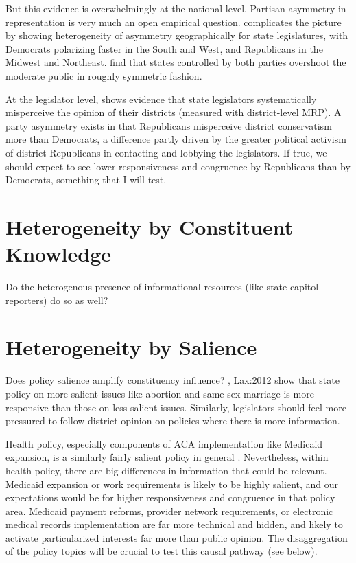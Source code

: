 \documentclass[
  oneside]{book}
\begin{document}
But this evidence is overwhelmingly at the national level. Partisan asymmetry in representation is very much an open empirical question. \citet{Shor:2020} complicates the picture by showing heterogeneity of asymmetry geographically for state legislatures, with Democrats polarizing faster in the South and West, and Republicans in the Midwest and Northeast. \citet{Lax:2012} find that states controlled by both parties overshoot the moderate public in roughly symmetric fashion.

At the legislator level, \citet{Broockman:2017} shows evidence that state legislators systematically misperceive the opinion of their districts (measured with district-level MRP). A party asymmetry exists in that Republicans misperceive district conservatism more than Democrats, a difference partly driven by the greater political activism of district Republicans in contacting and lobbying the legislators. If true, we should expect to see lower responsiveness and congruence by Republicans than by Democrats, something that I will test.

\hypertarget{heterogeneity-by-constituent-knowledge}{%
\section{Heterogeneity by Constituent Knowledge}\label{heterogeneity-by-constituent-knowledge}}

Do the heterogenous presence of informational resources (like state capitol reporters) do so as well?

\hypertarget{heterogeneity-by-salience}{%
\section{Heterogeneity by Salience}\label{heterogeneity-by-salience}}

Does policy salience amplify constituency influence? \citet{Lax:2009}, Lax:2012 show that state policy on more salient issues like abortion and same-sex marriage is more responsive than those on less salient issues. Similarly, legislators should feel more pressured to follow district opinion on policies where there is more information.

Health policy, especially components of ACA implementation like Medicaid expansion, is a similarly fairly salient policy in general \citep[Pacheco:2016]{Pacheco:2011}. Nevertheless, within health policy, there are big differences in information that could be relevant. Medicaid expansion or work requirements is likely to be highly salient, and our expectations would be for higher responsiveness and congruence in that policy area. Medicaid payment reforms, provider network requirements, or electronic medical records implementation are far more technical and hidden, and likely to activate particularized interests far more than public opinion. The disaggregation of the policy topics will be crucial to test this causal pathway (see below).
\end{document}
